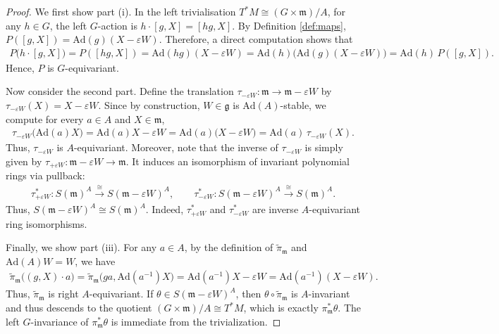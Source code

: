 \documentclass[11pt]{amsart}
\theoremstyle{definition}
\theoremstyle{plain}
\theoremstyle{conclusion}
\begin{document}
\begin{proof}
    We first show part (i). In the left trivialisation $T^*M \cong (G\times\mathfrak{m})/A$, for any $h \in G$, the left $G$-action is $h\cdot[g,X]=[hg,X]$. By Definition \ref{def:maps}, $ P([g,X])=\mathrm{Ad}(g)(X-\varepsilon W)$. Therefore, a direct computation shows that \begin{align*}
P\bigl(h\cdot[g,X]\bigr) = P([hg,X]) = \mathrm{Ad}(hg)(X-\varepsilon W) = \mathrm{Ad}(h)\bigl(\mathrm{Ad}(g)(X-\varepsilon W)\bigr) = \mathrm{Ad}(h)\,P([g,X]).
\end{align*} Hence, $P$ is $G$-equivariant.

Now consider the second part. Define the translation $\tau_{-\varepsilon W}:\mathfrak{m}\to\mathfrak{m}-\varepsilon W$ by $\tau_{-\varepsilon W}(X)=X-\varepsilon W$. Since by construction, $W \in \mathfrak{g}$ is $\mathrm{Ad}(A)$-stable, we compute for every $a\in A$ and $X\in\mathfrak{m}$, \begin{align*}
\tau_{-\varepsilon W}\bigl(\mathrm{Ad}(a)X\bigr) = \mathrm{Ad}(a)X-\varepsilon W = \mathrm{Ad}(a)\bigl(X-\varepsilon W\bigr) = \mathrm{Ad}(a)\,\tau_{-\varepsilon W}(X).
\end{align*} Thus, $\tau_{-\varepsilon W}$ is $A$-equivariant. Moreover, note that the inverse of $\tau_{-\varepsilon W}$ is simply given by  $\tau_{+\varepsilon W}:\mathfrak{m}-\varepsilon W\to\mathfrak{m}$. It induces an isomorphism of invariant polynomial rings via pullback: \begin{align*}
\tau_{+\varepsilon W}^*: S(\mathfrak{m})^A \xrightarrow{ \cong } S(\mathfrak{m}-\varepsilon W)^A, \qquad \tau_{-\varepsilon W}^*: S(\mathfrak{m}-\varepsilon W)^A \xrightarrow{\cong } S(\mathfrak{m})^A. 
\end{align*} Thus, $S(\mathfrak{m}-\varepsilon W)^A\cong S(\mathfrak{m})^A$. Indeed, $\tau_{+\varepsilon W}^*$ and $\tau_{-\varepsilon W}^*$ are inverse $A$-equivariant ring isomorphisms.

Finally, we show part (iii). For any $a\in A$, by the definition of $\widetilde{\pi}_{\mathfrak{m}}$ and $\mathrm{Ad}(A)W=W$, we have  \begin{align*}
\widetilde\pi_\mathfrak{m}\big((g,X)\cdot a\big)=\widetilde\pi_\mathfrak{m}\big(ga,\mathrm{Ad}(a^{-1})X\big) =\mathrm{Ad}(a^{-1})X-\varepsilon W =\mathrm{Ad}(a^{-1})(X-\varepsilon W).
\end{align*}  Thus, $\widetilde\pi_\mathfrak{m}$ is right $A$-equivariant. If $\theta \in S(\mathfrak{m}-\varepsilon W)^A$, then $\theta \circ \widetilde{\pi}_\mathfrak{m}$ is $A$-invariant and thus descends to the quotient $(G \times \mathfrak{m})/A \cong T^*M$, which is exactly $\pi_\mathfrak{m}^*\theta$. The left $G$-invariance of $\pi_\mathfrak{m}^*\theta$ is immediate from the trivialization.
\end{proof}
\end{document}
